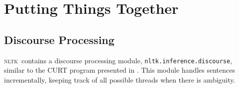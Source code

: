 \documentclass[11pt,a4paper]{article}
\newcommand{\NLTK}{\textsc{nltk}}
\newcommand{\dhgcode}[1]{{\tt #1}}
\begin{document}




\section{Putting Things Together}

\subsection{Discourse Processing}
\NLTK\ contains a discourse processing module,
\dhgcode{nltk.inference.discourse}, similar to the CURT program
presented in \cite{BB}.  This module handles sentences incrementally,
keeping track of all possible threads when there is ambiguity.
\end{document}
